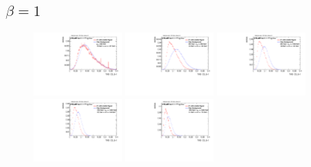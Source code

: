 \subsection*{$\beta=1$}
\begin{figure}
\includegraphics[width=0.3\textwidth]{sascha_input/Appendix/Distributions/higgs/distributions/beta1/h_assisted_tj_C2_bin1.pdf} \hspace{1mm}
\includegraphics[width=0.3\textwidth]{sascha_input/Appendix/Distributions/higgs/distributions/beta1/h_assisted_tj_C2_bin2.pdf} \hspace{4mm}
\includegraphics[width=0.3\textwidth]{sascha_input/Appendix/Distributions/higgs/distributions/beta1/h_assisted_tj_C2_bin3.pdf} 
\bigskip
\includegraphics[width=0.3\textwidth]{sascha_input/Appendix/Distributions/higgs/distributions/beta1/h_assisted_tj_C2_bin4.pdf} \hspace{4mm}
\includegraphics[width=0.3\textwidth]{sascha_input/Appendix/Distributions/higgs/distributions/beta1/h_assisted_tj_C2_bin5.pdf} 


\end{figure}
